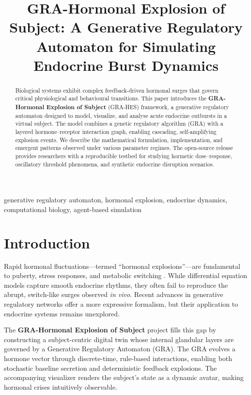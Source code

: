\documentclass[conference]{IEEEtran}
\begin{document}
\title{GRA-Hormonal Explosion of Subject: A Generative Regulatory Automaton for Simulating Endocrine Burst Dynamics}

\author{
}

\maketitle

\begin{abstract}
Biological systems exhibit complex feedback-driven hormonal surges that govern critical physiological and behavioural transitions. This paper introduces the \textbf{GRA-Hormonal Explosion of Subject} (GRA-HES) framework, a generative regulatory automaton designed to model, visualize, and analyse acute endocrine outbursts in a virtual subject. The model combines a genetic regulatory algorithm (GRA) with a layered hormone–receptor interaction graph, enabling cascading, self-amplifying explosion events. We describe the mathematical formulation, implementation, and emergent patterns observed under various parameter regimes. The open-source release provides researchers with a reproducible testbed for studying hormetic dose–response, oscillatory threshold phenomena, and synthetic endocrine disruption scenarios.
\end{abstract}

\begin{IEEEkeywords}
generative regulatory automaton, hormonal explosion, endocrine dynamics, computational biology, agent-based simulation
\end{IEEEkeywords}

\section{Introduction}
Rapid hormonal fluctuations—termed ``hormonal explosions''—are fundamental to puberty, stress responses, and metabolic switching \cite{m1}. While differential equation models capture smooth endocrine rhythms, they often fail to reproduce the abrupt, switch-like surges observed \textit{in vivo}. Recent advances in generative regulatory networks \cite{m2} offer a more expressive formalism, but their application to endocrine systems remains unexplored.

The \textbf{GRA-Hormonal Explosion of Subject} project fills this gap by constructing a subject-centric digital twin whose internal glandular layers are governed by a Generative Regulatory Automaton (GRA). The GRA evolves a hormone vector through discrete-time, rule-based interactions, enabling both stochastic baseline secretion and deterministic feedback explosions. The accompanying visualizer renders the subject’s state as a dynamic avatar, making hormonal crises intuitively observable.
\end{document}
